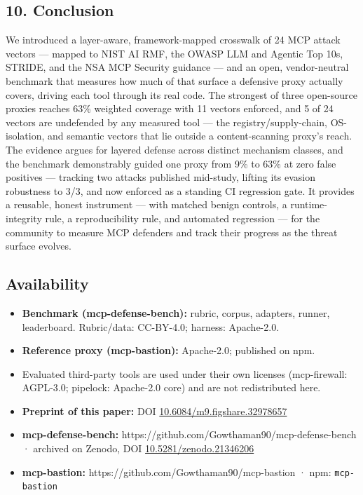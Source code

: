 \documentclass[
]{article}
\begin{document}
\subsection{10. Conclusion}\label{conclusion}

We introduced a layer-aware, framework-mapped crosswalk of 24 MCP attack
vectors --- mapped to NIST AI RMF, the OWASP LLM and Agentic Top 10s,
STRIDE, and the NSA MCP Security guidance --- and an open,
vendor-neutral benchmark that measures how much of that surface a
defensive proxy actually covers, driving each tool through its real
code. The strongest of three open-source proxies reaches 63\% weighted
coverage with 11 vectors enforced, and 5 of 24 vectors are undefended by
any measured tool --- the registry/supply-chain, OS-isolation, and
semantic vectors that lie outside a content-scanning proxy's reach. The
evidence argues for layered defense across distinct mechanism classes,
and the benchmark demonstrably guided one proxy from 9\% to 63\% at zero
false positives --- tracking two attacks published mid-study, lifting
its evasion robustness to 3/3, and now enforced as a standing CI
regression gate. It provides a reusable, honest instrument --- with
matched benign controls, a runtime-integrity rule, a reproducibility
rule, and automated regression --- for the community to measure MCP
defenders and track their progress as the threat surface evolves.

\subsection{Availability}\label{availability}

\begin{itemize}
\item
  \textbf{Benchmark (mcp-defense-bench):} rubric, corpus, adapters,
  runner, leaderboard. Rubric/data: CC-BY-4.0; harness: Apache-2.0.
\item
  \textbf{Reference proxy (mcp-bastion):} Apache-2.0; published on npm.
\item
  Evaluated third-party tools are used under their own licenses
  (mcp-firewall: AGPL-3.0; pipelock: Apache-2.0 core) and are not
  redistributed here.
\item
  \textbf{Preprint of this paper:} DOI
  \href{https://doi.org/10.6084/m9.figshare.32978657}{10.6084/m9.figshare.32978657}
\item
  \textbf{mcp-defense-bench:}
  https://github.com/Gowthaman90/mcp-defense-bench · archived on Zenodo,
  DOI
  \href{https://doi.org/10.5281/zenodo.21346206}{10.5281/zenodo.21346206}
\item
  \textbf{mcp-bastion:} https://github.com/Gowthaman90/mcp-bastion ·
  npm: \texttt{mcp-bastion}
\end{itemize}
\end{document}
